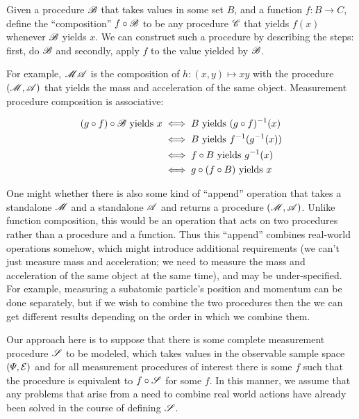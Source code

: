 \begin{definition}
Given a procedure $\mathscr{B}$ that takes values in some set $B$, and a function $f:B\to C$, define the ``composition'' $f\circ \mathscr{B}$ to be any procedure $\mathscr{C}$ that yields $f(x)$ whenever $\mathscr{B}$ yields $x$. We can construct such a procedure by describing the steps: first, do $\mathscr{B}$ and secondly, apply $f$ to the value yielded by $\mathscr{B}$.
\end{definition}

For example, $\mathscr{MA}$ is the composition of $h:(x,y)\mapsto xy$ with the procedure $(\mathscr{M},\mathscr{A})$ that yields the mass and acceleration of the same object. Measurement procedure composition is associative:

\begin{align}
    (g\circ f)\circ\mathscr{B}\text{ yields } x &\iff B\text{ yields } (g\circ f)^{-1}(x) \\
    &\iff B\text{ yields } f^{-1}(g^{-1}(x))\\
    &\iff f\circ B \text{ yields } g^{-1}(x)\\
    &\iff g\circ(f\circ B)\text{ yields } x
\end{align}


One might whether there is also some kind of ``append'' operation that takes a standalone $\mathscr{M}$ and a standalone $\mathscr{A}$ and returns a procedure $(\mathscr{M},\mathscr{A})$. Unlike function composition, this would be an operation that acts on two procedures rather than a procedure and a function. Thus this ``append'' combines real-world operations somehow, which might introduce additional requirements (we can't just measure mass and acceleration; we need to measure the mass and acceleration of the same object at the same time), and may be under-specified. For example, measuring a subatomic particle's position and momentum can be done separately, but if we wish to combine the two procedures then the we can get different results depending on the order in which we combine them.

Our approach here is to suppose that there is some complete measurement procedure $\mathscr{S}$ to be modeled, which takes values in the observable sample space $(\Psi,\mathcal{E})$ and for all measurement procedures of interest there is some $f$ such that the procedure is equivalent to $f\circ \mathscr{S}$ for some $f$. In this manner, we assume that any problems that arise from a need to combine real world actions have already been solved in the course of defining $\mathscr{S}$.

